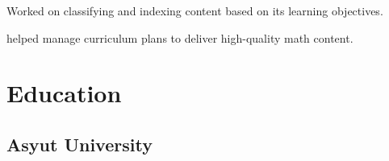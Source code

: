 \documentclass[]{deedy-resume-openfont}
\begin{document}
\begin{minipage}[t]{0.66\textwidth}
\vspace{\topsep}
\begin{tightemize}
\item Worked on classifying and indexing content based on its learning objectives.
\item helped manage curriculum plans to deliver high-quality math content.
\end{tightemize}
\sectionsep


\section{Education} 

\subsection{Asyut University}
\sectionsep

%
%

\end{minipage} 
\hfill
\end{document}
